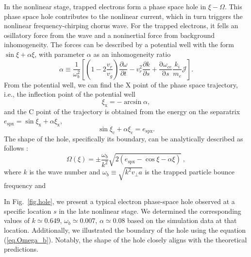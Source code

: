In the nonlinear stage, trapped electrons form a phase space hole in $\xi-\Omega$. This phase space hole contributes to the nonlinear current, which in turn triggers the nonlinear frequency-chirping chorus wave. 
For the trapped electrons, it fells an osillatory force from the wave and a noninertial force from background inhomogeneity. The forces can be described by a potential well with the form $\sin \xi + \alpha \xi$, with parameter $\alpha$ as an inhomogeneity ratio \cite{omura2008,tao2020}
\begin{equation}\label{eq.alp}
    \alpha \equiv \frac{1}{\omega_{b}^2}\left[\left(1 - 2\frac{v_r}{v_g}\right)\frac{\partial \omega}{\partial t}  -v_r^2 \frac{\partial k}{\partial s}+ \frac{\mathrm{\partial} \omega_{ce}}{\mathrm{\partial} s}\frac{k_i}{m_e}\mathcal{J}\right].
\end{equation}
From the potential well, we can find the X point of the phase space trajectory, i.e., the inflection point of the potential well
\begin{equation}
    \xi_\mathrm{x} = - \arcsin \alpha,
\end{equation}
and the C point of the trajectory is obtained from the energy on the separatrix $e_\mathrm{spx} = \sin \xi_\mathrm{x} + \alpha \xi_\mathrm{x}$,
\begin{equation}
    \sin \xi_\mathrm{c} + \alpha \xi_\mathrm{c} = e_\mathrm{spx}.
\end{equation}
The shape of the hole, specifically its boundary, can be analytically described as follows \cite{zheng2023a,omura2008}:
\begin{equation}\label{eq.Omega_b}
    \Omega(\xi) = \pm \frac{\omega_b}{k^2} \sqrt{2 (e_\mathrm{spx}-\cos \xi - \alpha \xi)}~,
\end{equation}
where $k$ is the wave number and $\omega_b\equiv \sqrt{k^2 v_\perp a}$ is the trapped particle bounce frequency and


In Fig.~\ref{fig.hole}, we present a typical electron phase-space hole observed at a specific location $s$ in the late nonlinear stage. We determined the corresponding values of $k \simeq 0.649$, $\omega_b \simeq 0.007$, $\alpha \simeq 0.08$ based on the simulation data at that location. Additionally, we illustrated the boundary of the hole using the equation (\ref{eq.Omega_b}). Notably, the shape of the hole closely aligns with the theoretical predictions.

